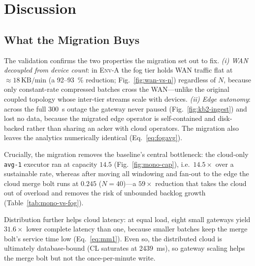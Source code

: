 \documentclass[conference]{IEEEtran}
\newcommand{\KBmin}{\,\text{KB/min}}
\newcommand{\code}[1]{\texttt{#1}}
\begin{document}
\section{Discussion}\label{sec:discussion}
\subsection{What the Migration Buys}
The validation confirms the two properties the migration set out to fix.
\emph{(i) WAN decoupled from device count}: in \textsc{Env-A} the fog tier holds
WAN traffic flat at $\approx\!18\KBmin$ (a \SI{92}{}--\SI{93}{\percent} reduction;
Fig.~\ref{fig:wan-vs-n}) regardless of $N$, because only constant-rate compressed
batches cross the WAN---unlike the original coupled topology whose inter-tier
streams scale with devices. \emph{(ii) Edge autonomy}: across the full
\SI{300}{\second} outage the gateway never paused (Fig.~\ref{fig:kb2-ingest}) and
lost no data, because the migrated edge operator is self-contained and disk-backed
rather than sharing an acker with cloud operators. The migration also leaves the
analytics numerically identical (Eq.~\eqref{eq:fogavg}).

Crucially, the migration removes the baseline's central bottleneck: the
cloud-only \code{avg-1} executor ran at capacity $14.5$
(Fig.~\ref{fig:mono-cap}), i.e.\ $14.5\times$ over a sustainable rate, whereas
after moving all windowing and fan-out to the edge the cloud merge bolt runs at
$0.245$ ($N=40$)---a $59\times$ reduction that takes the cloud out of overload and
removes the risk of unbounded backlog growth (Table~\ref{tab:mono-vs-fog}).

Distribution further helps cloud latency: at equal load, eight small gateways
yield $31.6\times$ lower complete latency than one, because smaller batches keep
the merge bolt's service time low (Eq.~\eqref{eq:mm1}). Even so, the distributed
cloud is ultimately database-bound (CL saturates at \SI{2439}{\milli\second}), so
gateway scaling helps the merge bolt but not the once-per-minute write.
\end{document}
